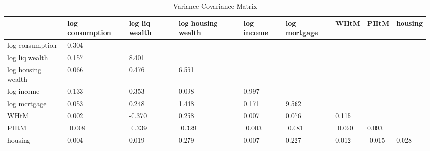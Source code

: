 \begin{table}[htbp]
\caption{\label{clabel} Variance Covariance Matrix}\centering\medskip
\begin{tabular}{lllllllll} \hline \hline
 & log consumption  & log liq wealth  & log housing wealth  & log income  & log mortgage  & WHtM  & PHtM  & housing  \\  \hline 
log consumption &     0.304 \\  
log liq wealth &     0.157 &     8.401 \\  
log housing wealth &     0.066 &     0.476 &     6.561 \\  
log income &     0.133 &     0.353 &     0.098 &     0.997 \\  
log mortgage &     0.053 &     0.248 &     1.448 &     0.171 &     9.562 \\  
WHtM &     0.002 &    -0.370 &     0.258 &     0.007 &     0.076 &     0.115 \\  
PHtM &    -0.008 &    -0.339 &    -0.329 &    -0.003 &    -0.081 &    -0.020 &     0.093 \\  
housing &     0.004 &     0.019 &     0.279 &     0.007 &     0.227 &     0.012 &    -0.015 &     0.028 \\  
\hline \hline \end{tabular}
\end{table}
